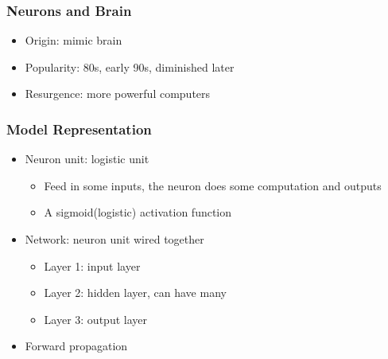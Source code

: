 \documentclass[]{article}
\providecommand{\tightlist}{%
  \setlength{\itemsep}{0pt}\setlength{\parskip}{0pt}}
\begin{document}
\hypertarget{neurons-and-brain}{%
\subsubsection{Neurons and Brain}\label{neurons-and-brain}}

\begin{itemize}
\tightlist
\item
  Origin: mimic brain
\item
  Popularity: 80s, early 90s, diminished later
\item
  Resurgence: more powerful computers
\end{itemize}

\hypertarget{model-representation-1}{%
\subsubsection{Model Representation}\label{model-representation-1}}

\begin{itemize}
\tightlist
\item
  Neuron unit: logistic unit

  \begin{itemize}
  \tightlist
  \item
    Feed in some inputs, the neuron does some computation and outputs
  \item
    A sigmoid(logistic) activation function
  \end{itemize}
\item
  Network: neuron unit wired together

  \begin{itemize}
  \tightlist
  \item
    Layer 1: input layer
  \item
    Layer 2: hidden layer, can have many
  \item
    Layer 3: output layer
  \end{itemize}
\end{itemize}

\begin{itemize}
\tightlist
\item
  Forward propagation
\end{itemize}
\end{document}
